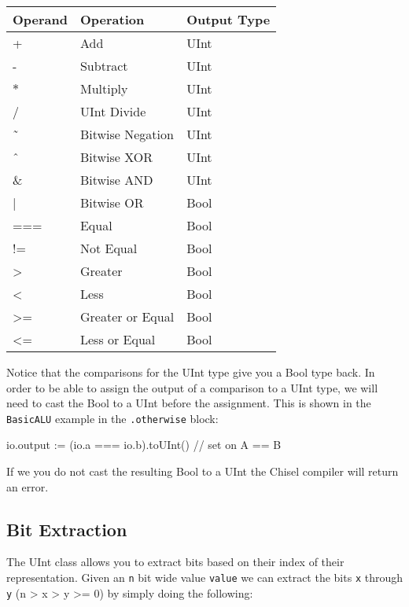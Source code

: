 \documentclass[twocolumn, 10pt]{article}
\begin{document}
\begin{center}
	\begin{tabular}{| l | l | l | }
	\hline
	Operand & Operation & Output Type \\ \hline
	+ & Add & UInt  \\ \hline
	- & Subtract & UInt  \\ \hline
	$\ast$ & Multiply & UInt \\ \hline
	/ & UInt Divide & UInt \\ \hline
	\~\ & Bitwise Negation & UInt \\ \hline
	\^\ & Bitwise XOR & UInt\\ \hline
	\& & Bitwise AND & UInt \\ \hline
	 | & Bitwise OR & Bool \\ \hline
	=== & Equal & Bool \\ \hline
	!= & Not Equal & Bool \\ \hline
	> & Greater & Bool \\ \hline
	< & Less & Bool \\ \hline
	>= & Greater or Equal & Bool \\ \hline
	<= & Less or Equal & Bool \\ \hline
	\end{tabular}
\end{center}

Notice that the comparisons for the UInt type give you a Bool type back. In order to be able to assign the output of a comparison to a UInt type, we will need to cast the Bool to a UInt before the assignment. This is shown in the \verb+BasicALU+ example in the \verb+.otherwise+ block:

\begin{scala}
io.output :=  (io.a === io.b).toUInt() // set on A == B
\end{scala}

If we you do not cast the resulting Bool to a UInt the Chisel compiler will return an error.

\subsection{Bit Extraction}

The UInt class allows you to extract bits based on their index of their representation. Given an \verb+n+ bit wide value \verb+value+ we can extract the bits \verb+x+ through \verb+y+ (n > x > y >= 0) by simply doing the following:
\end{document}
